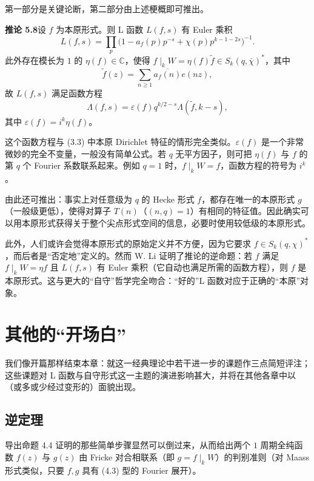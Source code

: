 第一部分是关键论断，第二部分由上述梗概即可推出。

\par\medskip\noindent\textbf{推论 5.8}\quad 设 $f$ 为本原形式。则 L 函数 $L(f,s)$ 有 Euler 乘积
\begin{equation}\tag{5.4}\label{c3:eq:5.4}
L(f,s)=\prod_{p}\bigl(1-a_{f}(p)p^{-s}+\chi(p)p^{k-1-2s}\bigr)^{-1}.
\end{equation}
此外存在模长为 $1$ 的 $\eta(f)\in\mathbb{C}$，使得 $f\mid_{k}W=\eta(f)\tilde f\in S_{k}(q,\overline{\chi})^{*}$，其中
\[
\tilde f(z)=\sum_{n\ge1}\overline{a_{f}(n)}e(nz),
\]
故 $L(f,s)$ 满足函数方程
\[
\Lambda(f,s)=\varepsilon(f)q^{k/2-s}\Lambda(\tilde f,k-s),
\]
其中 $\varepsilon(f)=i^{k}\eta(f)$。

这个函数方程与 (3.3) 中本原 Dirichlet 特征的情形完全类似。$\varepsilon(f)$ 是一个非常微妙的完全不变量，一般没有简单公式。若 $q$ 无平方因子，则可把 $\eta(f)$ 与 $f$ 的第 $q$ 个 Fourier 系数联系起来。例如 $q=1$ 时，$f\mid_{k}W=f$，函数方程的符号为 $i^{k}$。

由此还可推出：事实上对任意级为 $q$ 的 Hecke 形式 $f$，都存在唯一的本原形式 $g$（一般级更低），使得对算子 $T(n)$（$(n,q)=1$）有相同的特征值。因此确实可以用本原形式获得关于整个尖点形式空间的信息，必要时使用较低级的本原形式。

此外，人们或许会觉得本原形式的原始定义并不方便，因为它要求 $f\in S_{k}(q,\chi)^{*}$，而后者是“否定地”定义的。然而 W. Li 证明了推论的逆命题：若 $f$ 满足 $f\mid_{k}W=\eta f$ 且 $L(f,s)$ 有 Euler 乘积（它自动也满足所需的函数方程），则 $f$ 是本原形式。这与更大的“自守”哲学完全吻合：“好的”L 函数对应于正确的“本原”对象。

\section{其他的“开场白”}\label{c3:sec:6}

我们像开篇那样结束本章：就这一经典理论中若干进一步的课题作三点简短评注；这些课题对 L 函数与自守形式这一主题的演进影响甚大，并将在其他各章中以（或多或少经过变形的）面貌出现。

\subsection{逆定理}\label{c3:sec:6.1}

导出命题 4.4 证明的那些简单步骤显然可以倒过来，从而给出两个 $1$ 周期全纯函数 $f(z)$ 与 $g(z)$ 由 Fricke 对合相联系（即 $g=f\mid_{k}W$）的判别准则（对 Maass 形式类似，只要 $f,g$ 具有 (4.3) 型的 Fourier 展开）。

